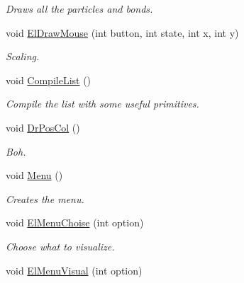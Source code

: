 \begin{DoxyCompactItemize}
\begin{DoxyCompactList}\small\item\em Draws all the particles and bonds. \end{DoxyCompactList}\item 
void \hyperlink{classElPoly_a3e0a298765b939458531a9590e84c275}{El\+Draw\+Mouse} (int button, int state, int x, int y)\hypertarget{classElPoly_a3e0a298765b939458531a9590e84c275}{}\label{classElPoly_a3e0a298765b939458531a9590e84c275}

\begin{DoxyCompactList}\small\item\em Scaling. \end{DoxyCompactList}\item 
void \hyperlink{classElPoly_aae73eb2f2ced8322a9ce2aeb361cd483}{Compile\+List} ()\hypertarget{classElPoly_aae73eb2f2ced8322a9ce2aeb361cd483}{}\label{classElPoly_aae73eb2f2ced8322a9ce2aeb361cd483}

\begin{DoxyCompactList}\small\item\em Compile the list with some useful primitives. \end{DoxyCompactList}\item 
void \hyperlink{classElPoly_a6793bf2cb18afd12d89c95d402a80ca9}{Dr\+Pos\+Col} ()\hypertarget{classElPoly_a6793bf2cb18afd12d89c95d402a80ca9}{}\label{classElPoly_a6793bf2cb18afd12d89c95d402a80ca9}

\begin{DoxyCompactList}\small\item\em Boh. \end{DoxyCompactList}\item 
void \hyperlink{classElPoly_afdf1ca9e7afc3e7ec41b47fea4b3d80d}{Menu} ()\hypertarget{classElPoly_afdf1ca9e7afc3e7ec41b47fea4b3d80d}{}\label{classElPoly_afdf1ca9e7afc3e7ec41b47fea4b3d80d}

\begin{DoxyCompactList}\small\item\em Creates the menu. \end{DoxyCompactList}\item 
void \hyperlink{classElPoly_a5c117667fbf63957d9f36808b5b4c942}{El\+Menu\+Choise} (int option)\hypertarget{classElPoly_a5c117667fbf63957d9f36808b5b4c942}{}\label{classElPoly_a5c117667fbf63957d9f36808b5b4c942}

\begin{DoxyCompactList}\small\item\em Choose what to visualize. \end{DoxyCompactList}\item 
void \hyperlink{classElPoly_af63d4f8105b2cc36e7de437e9321f8f9}{El\+Menu\+Visual} (int option)\hypertarget{classElPoly_af63d4f8105b2cc36e7de437e9321f8f9}{}\label{classElPoly_af63d4f8105b2cc36e7de437e9321f8f9}


\end{DoxyCompactItemize}
